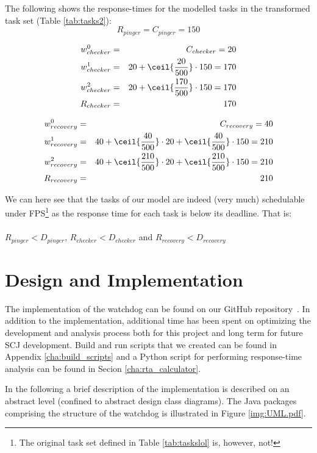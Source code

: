 The following shows the response-times for the modelled tasks in the transformed task set (Table \ref{tab:tasks2}):
\begin{equation}
\label{eq:pingerrta1}
     R_{pinger} = C_{pinger} = 150 
\end{equation}

\begin{eqnarray}
    w_{checker}^0 &=& C_{checker} = 20 \nonumber \\ 
    w_{checker}^1 &=& 20 + \ceil{\frac{20}{500}} \cdot 150 = 170 \nonumber \\ 
    w_{checker}^2 &=& 20 + \ceil{\frac{170}{500}} \cdot 150 = 170 \nonumber \\
    R_{checker} &=& 170
\end{eqnarray}

\begin{eqnarray}
    w_{recovery}^0 &=& C_{recovery} = 40 \nonumber \\ 
    w_{recovery}^1 &=& 40 + \ceil{\frac{40}{500}} \cdot 20 + \ceil{\frac{40}{500}} \cdot 150 = 210 \nonumber \\ 
    w_{recovery}^2 &=& 40 + \ceil{\frac{210}{500}} \cdot 20 + \ceil{\frac{210}{500}} \cdot 150 = 210 \nonumber \\
    R_{recovery} &=& 210
\end{eqnarray}

We can here see that the tasks of our model are indeed (very much) schedulable under FPS\footnote{The original task set defined in Table \ref{tab:taskslol} is, however, not!} as the response time for each task is below its deadline. That is: \\\\
$R_{pinger} < D_{pinger}$, $R_{checker} < D_{checker}$ and $R_{recovery} < D_{recovery}$

\section{Design and Implementation}
The implementation of the watchdog can be found on our GitHub repository~\cite{SW902e12:CSPinSCJ}. In addition to the implementation, additional time has been spent on optimizing the development and analysis process both for this project and long term for future SCJ development. Build and run scripts that we created can be found in Appendix \ref{cha:build_scripts} and a Python script for performing response-time analysis can be found in Secion \ref{cha:rta_calculator}.

In the following a brief description of the implementation is described on an abstract level (confined to abstract design class diagrams). The Java packages comprising the structure of the watchdog is illustrated in Figure \ref{img:UML.pdf}. 

